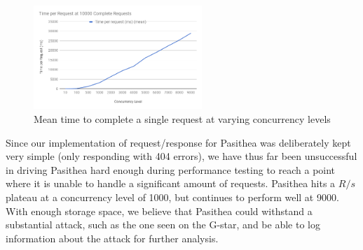 \begin{figure}[t]
   \centering
   \includegraphics[width=2.5in]{images/TimeperRequest.png} 
   \caption{Mean time to complete a single request at varying concurrency levels}
   \label{fig:T/R}
\end{figure}

Since our implementation of request/response for Pasithea was deliberately kept very simple (only responding with 404 errors), we have thus far been unsuccessful in driving Pasithea hard enough during performance testing to reach a point where it is unable to handle a significant amount of requests.  
Pasithea hits a $R/s$ plateau at a concurrency level of 1000, but continues to perform well at 9000.
With enough storage space, we believe that Pasithea could withstand a substantial attack, such as the one seen on the G-star, and be able to log information about the attack for further analysis.
